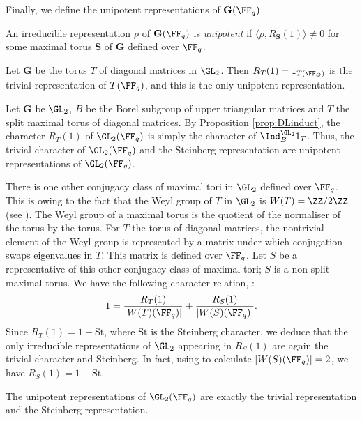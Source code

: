 Finally, we define the unipotent representations of $\mathbf G(\FF_q)$.

\begin{defn}
    An irreducible representation $\rho$ of $\mathbf G(\FF_q)$ is \textit{unipotent} if $\langle \rho, R_{\mathbf S}(1)\rangle \neq 0$ for some maximal torus $\mathbf S$ of $\mathbf G$ defined over $\FF_q$.
\end{defn}



\begin{example}\label{ex:uniT}
    Let $\mathbf G$ be the torus $T$ of diagonal matrices in $\GL_2$. Then $R_T(1) = 1_{T(\FF_Q)}$ is the trivial representation of $T(\FF_q)$, and this is the only unipotent representation.
\end{example}

\begin{example}\label{ex:uniG}
    Let $\mathbf G$ be $\GL_2$, $B$ be the Borel subgroup of upper triangular matrices and $T$ the split maximal torus of diagonal matrices. By Proposition \ref{prop:DLinduct}, the character $R_T(1)$ of $\GL_2(\FF_q)$ is simply the character of $\Ind_{B}^{\GL_2}1_{T}$. Thus, the trivial character of $\GL_2(\FF_q)$ and the Steinberg representation are unipotent representations of $\GL_2(\FF_q)$. 
    
    There is one other conjugacy class of maximal tori in $\GL_2$ defined over $\FF_q$. This is owing to the fact that the Weyl group of $T$ in $\GL_2$ is $W(T) = \ZZ/2\ZZ$ (see \cite[Proposition 3.3.3]{BH1}). The Weyl group of a maximal torus is the quotient of the normaliser of the torus by the torus. For $T$ the torus of diagonal matrices, the nontrivial element of the Weyl group is represented by a matrix under which conjugation swaps eigenvalues in $T$. This matrix is defined over $\FF_q$. Let $S$ be a representative of this other conjugacy class of maximal tori; $S$ is a non-split maximal torus. We have the following character relation, \cite[Corollary 7.6.5]{BH1}:
    $$1 = \frac{R_{T}(1)}{|W(T)(\FF_q)|} + \frac{R_{S}(1)}{|W(S)(\FF_q)|}.$$ Since $R_{T}(1) = 1+\mathrm{St}$, where $\mathrm{St}$ is the Steinberg character, we deduce that the only irreducible representations of $\GL_2$ appearing in $R_S(1)$ are again the trivial character and Steinberg. In fact, using \cite[Proposition 3.3.6]{BH1} to calculate $|W(S)(\FF_q)|=2$, we have $R_S(1) = 1-\mathrm{St}$.

    The unipotent representations of $\GL_2(\FF_q)$ are exactly the trivial representation and the Steinberg representation.
\end{example}


